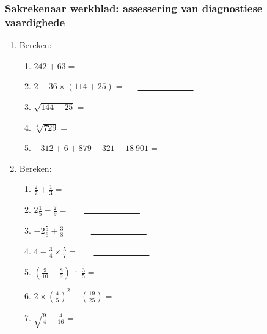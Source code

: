 \subsubsection{Sakrekenaar werkblad: assessering van diagnostiese vaardighede}
\begin{enumerate}[itemsep=7pt, label=\textbf{\arabic*}. ] 
 \item Bereken:
\begin{enumerate}[itemsep=6pt,label=\textbf{(\alph*)}]
\item $ 242 + 63=$   ~~~\underline{~~~~~~~~~~~~~}
\item $2-36 \times (114 + 25)=$~~~\underline{~~~~~~~~~~~~~}
\item $\sqrt{144+25}=$~~~\underline{~~~~~~~~~~~~~}
\item $\sqrt[4]{729}=$~~~\underline{~~~~~~~~~~~~~}
\item $-312 + 6 + 879 -321 + 18~ 901=$ ~~~\underline{~~~~~~~~~~~~~}
\end{enumerate}

\item Bereken:
\begin{enumerate}[itemsep=6pt,label=\textbf{(\alph*)}]
\item $\frac{2}{7} + \frac{1}{3}=$  ~~~\underline{~~~~~~~~~~~~~}
\item $2\frac{1}{5} - \frac{2}{9}=$ ~~~\underline{~~~~~~~~~~~~~}
\item $-2\frac{5}{6} + \frac{3}{8}=$ ~~~\underline{~~~~~~~~~~~~~}
\item $ 4 - \frac{3}{4} \times \frac{5}{7}=$ ~~~\underline{~~~~~~~~~~~~~}
\item $\left(\frac{9}{10} - \frac{8}{9}\right) \div \frac{3}{5}=$ ~~~\underline{~~~~~~~~~~~~~}
\item $2\times \left(\frac{4}{5}\right)^2 - \left(\frac{19}{25}\right)=$ ~~~\underline{~~~~~~~~~~~~~}
\item $\sqrt{\frac{9}{4} - \frac{4}{16}} =$ ~~~\underline{~~~~~~~~~~~~~}
\end{enumerate}
\end{enumerate}


